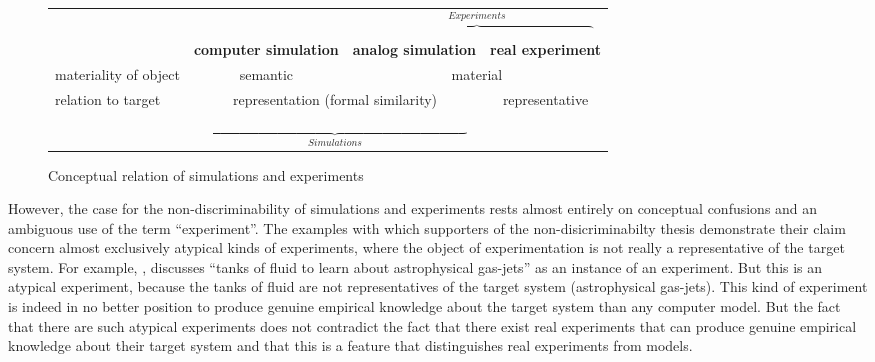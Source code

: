 \documentclass[12pt, a4paper]{article}
\begin{document}
\begin{figure}
\doublespacing
\begin{center}
\begin{scriptsize}
\begin{tabular}{l|c|c|c|}
  \multicolumn{1}{c}{ } & \multicolumn{1}{c}{ } & \multicolumn{2}{c}{$\overbrace{\hspace{7cm}}^{Experiments}$} \\ \cline{2-4}
                      & \textbf{computer simulation} & \textbf{analog
                      simulation} & \textbf{real experiment} \\ \hline
materiality of object & semantic              &
                      \multicolumn{2}{c|}{material} \\ \hline
relation to target & \multicolumn{2}{c|}{representation (formal
			          similarity)}       & representative \\ \hline
\multicolumn{1}{c}{ } &
\multicolumn{2}{c}{$\underbrace{\hspace{8cm}}_{Simulations}$} &
\multicolumn{1}{c}{ } \\
\end{tabular}
\end{scriptsize}
\end{center}
\caption{\small Conceptual relation of simulations and experiments \citep{Arnold2013c}}\label{SimulationExperimentsSchema}
\end{figure}


However, the case for the non-discriminability of simulations and
experiments rests almost entirely on conceptual confusions and an
ambiguous use of the term ``experiment''. The examples with which
supporters of the non-disicriminabilty thesis demonstrate their claim
concern almost exclusively atypical kinds of experiments, where the
object of experimentation is not really a representative of the target
system. For example, \citet[590]{winsberg:2009}, discusses ``tanks of
fluid to learn about astrophysical gas-jets'' as an instance of an
experiment. But this is an atypical experiment, because the tanks of
fluid are not representatives of the target system (astrophysical
gas-jets). This kind of experiment is indeed in no better position to
produce genuine empirical knowledge about the target system than any
computer model. But the fact that there are such atypical experiments
does not contradict the fact that there exist real experiments that
can produce genuine empirical knowledge about their target system and
that this is a feature that distinguishes real experiments from
models.
\end{document}
